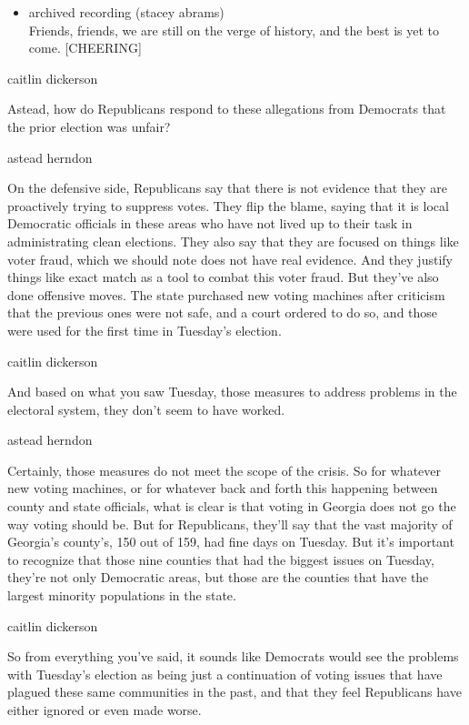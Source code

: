 \begin{itemize}
\tightlist
\item
  archived recording (stacey abrams)\\
  Friends, friends, we are still on the verge of history, and the best
  is yet to come. {[}CHEERING{]}
\end{itemize}

caitlin dickerson

Astead, how do Republicans respond to these allegations from Democrats
that the prior election was unfair?

astead herndon

On the defensive side, Republicans say that there is not evidence that
they are proactively trying to suppress votes. They flip the blame,
saying that it is local Democratic officials in these areas who have not
lived up to their task in administrating clean elections. They also say
that they are focused on things like voter fraud, which we should note
does not have real evidence. And they justify things like exact match as
a tool to combat this voter fraud. But they've also done offensive
moves. The state purchased new voting machines after criticism that the
previous ones were not safe, and a court ordered to do so, and those
were used for the first time in Tuesday's election.

caitlin dickerson

And based on what you saw Tuesday, those measures to address problems in
the electoral system, they don't seem to have worked.

astead herndon

Certainly, those measures do not meet the scope of the crisis. So for
whatever new voting machines, or for whatever back and forth this
happening between county and state officials, what is clear is that
voting in Georgia does not go the way voting should be. But for
Republicans, they'll say that the vast majority of Georgia's county's,
150 out of 159, had fine days on Tuesday. But it's important to
recognize that those nine counties that had the biggest issues on
Tuesday, they're not only Democratic areas, but those are the counties
that have the largest minority populations in the state.

caitlin dickerson

So from everything you've said, it sounds like Democrats would see the
problems with Tuesday's election as being just a continuation of voting
issues that have plagued these same communities in the past, and that
they feel Republicans have either ignored or even made worse.

